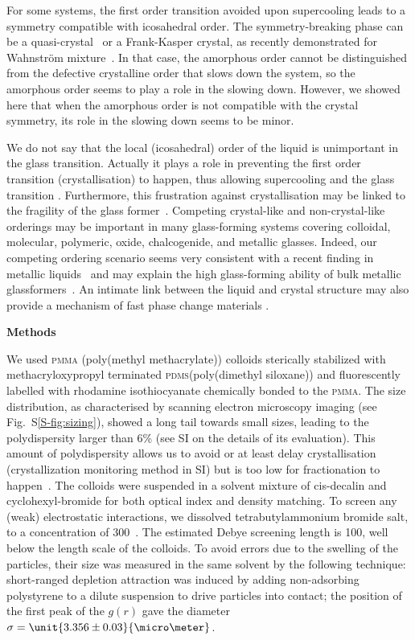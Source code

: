 For some systems, the first order transition avoided upon supercooling leads to a symmetry compatible with icosahedral order. The symmetry-breaking phase can be a quasi-crystal~\citep{Doye2003} or a Frank-Kasper crystal, as recently demonstrated for Wahnstr\"om mixture~\citep{Pedersen2010}. In that case, the amorphous order cannot be distinguished from the defective crystalline order that slows down the system, so the amorphous order seems to play a role in the slowing down. However, we showed here that when the amorphous order is not compatible with the crystal symmetry, its role in the slowing down seems to be minor.

We do not say that the local (icosahedral) order of the liquid is unimportant in the glass transition. Actually it plays a role in preventing the first order transition (crystallisation) to happen, thus allowing supercooling and the glass transition \cite{TanakaMJPCM}. Furthermore, this frustration against crystallisation may be linked to the fragility of the glass former~\citep{TanakaGJPCM,tanaka2010critical}. Competing crystal-like and non-crystal-like orderings may be important in many glass-forming systems covering colloidal, molecular, polymeric, oxide, chalcogenide, and metallic glasses. Indeed, our competing ordering scenario seems very consistent with a recent finding in metallic liquids~\cite{liu2010metallic} and may explain the high glass-forming ability of bulk metallic glassformers~\cite{Wang2004}. An intimate link between the liquid and crystal structure may also provide a mechanism of fast phase change materials \cite{wuttig2007phase}.

\vspace{1cm}
\noindent
\textbf{Methods}

We used \textsc{pmma} (poly(methyl methacrylate)) colloids sterically stabilized with methacryloxypropyl terminated \textsc{pdms}(poly(dimethyl siloxane)) and fluorescently labelled with rhodamine isothiocyanate chemically bonded to the \textsc{pmma}. The size distribution, as characterised by scanning electron microscopy imaging (see Fig.~S\ref{S-fig:sizing}), showed a long tail towards small sizes, leading to the polydispersity larger than 6\% (see SI on the details of its evaluation). This amount of polydispersity allows us to avoid or at least delay crystallisation~\cite{Zaccarelli2009} (crystallization monitoring method in SI) but is too low for fractionation to happen~\citep{Fasolo2003}. The colloids were suspended in a solvent mixture of cis-decalin and cyclohexyl-bromide for both optical index and density matching. To screen any (weak) electrostatic interactions, we dissolved tetrabutylammonium bromide salt, to a concentration of \unit{300}{\nano\mole\per\liter}~\citep{royall2005}. The estimated Debye screening length is \unit{100}{\nano\metre}, well below the length scale of the colloids. To avoid errors due to the swelling of the particles, their size was measured in the same solvent by the following technique: short-ranged depletion attraction was induced by adding non-adsorbing polystyrene to a dilute suspension to drive particles into contact; the position of the first peak of the $g(r)$ gave the diameter $\sigma = \unit{3.356\pm0.03}{\micro\meter}$.

